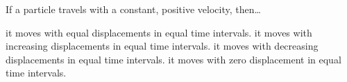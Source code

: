\documentclass[answers]{exam}
\begin{document}
\begin{questions}
\question
If a particle travels with a constant, positive velocity, then\ldots

\begin{randomizechoices}
    \correctchoice it moves with equal displacements in equal time intervals.
    \choice it moves with increasing displacements in equal time intervals.
    \choice it moves with decreasing displacements in equal time intervals.
    \choice it moves with zero displacement in equal time intervals.
\end{randomizechoices}


\end{questions}
\end{document}
